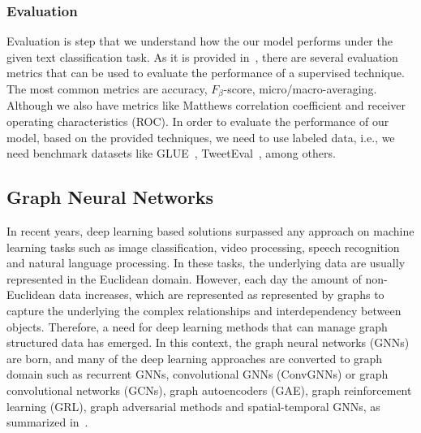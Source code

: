 \subsubsection{Evaluation}
Evaluation is step that we understand how the our model performs under the given text classification task. As it is provided in~\autocite{li20tc,minaee20tc}, there are several evaluation metrics that can be used to evaluate the performance of a supervised technique. The most common metrics are accuracy, \(F_\beta \)-score, micro/macro-averaging. Although we also have metrics like Matthews correlation coefficient and receiver operating characteristics (ROC). In order to evaluate the performance of our model, based on the provided techniques, we need to use labeled data, i.e., we need benchmark datasets like GLUE~\autocite{wang18glue}, TweetEval~\autocite{tweeteval}, among others.

\subsection{Graph Neural Networks}\label{sec:related:GNN}
In recent years, deep learning based solutions surpassed any approach on machine learning tasks such as image classification, video processing, speech recognition and natural language processing. In these tasks, the underlying data are usually represented in the Euclidean domain. However, each day the amount of non-Euclidean data increases, which are represented as represented by graphs to capture the underlying the complex relationships and interdependency between objects. Therefore, a need for deep learning methods that can manage graph structured data has emerged. In this context, the graph neural networks (GNNs) are born, and many of the deep learning approaches are converted to graph domain such as recurrent GNNs, convolutional GNNs (ConvGNNs) or graph convolutional networks (GCNs), graph autoencoders (GAE), graph reinforcement learning (GRL), graph adversarial methods and spatial-temporal GNNs, as summarized in~\autocite{zhou20gnn,wu21gnn,zhang18dlongraphs,sun18adversarial}.

